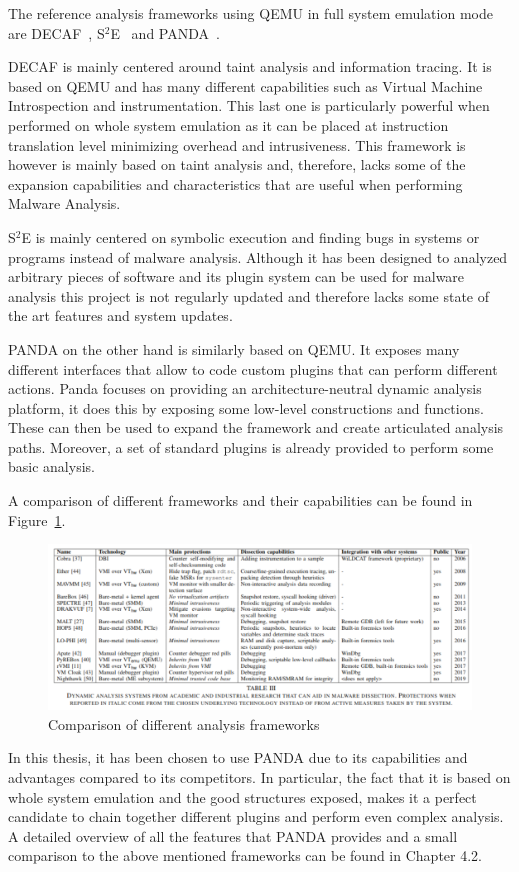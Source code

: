 The reference analysis frameworks using QEMU in full system emulation mode are DECAF~\cite{decaf}, S$^2$E~\cite{s2e} and PANDA~\cite{panda}. 

DECAF is mainly centered around taint analysis and information tracing. It is based on QEMU and has many different capabilities such as Virtual Machine Introspection and instrumentation. This last one is particularly powerful when performed on whole system emulation as it can be placed at instruction translation level minimizing overhead and intrusiveness. This framework is however is mainly based on taint analysis and, therefore, lacks some of the expansion capabilities and characteristics that are useful when performing Malware Analysis. 

S$^2$E is mainly centered on symbolic execution and finding bugs in systems or programs instead of malware analysis. Although it has been designed to analyzed arbitrary pieces of software and its plugin system can be used for malware analysis this project is not regularly updated and therefore lacks some state of the art features and system updates.  

PANDA on the other hand is similarly based on QEMU. It exposes many different interfaces that allow to code custom plugins that can perform different actions. Panda focuses on providing an architecture-neutral dynamic analysis platform, it does this by exposing some low-level constructions and functions. These can then be used to expand the framework and create articulated analysis paths. Moreover, a set of standard plugins is already provided to perform some basic analysis.

A comparison of different frameworks and their capabilities can be found in Figure~\ref{fig:frcmp}.

\begin{figure}[htp]
\centering
\includegraphics[width=\linewidth]{images/framcomp.png}
\caption{Comparison of different analysis frameworks~\cite{9018111}}
\label{fig:frcmp}
\end{figure}

In this thesis, it has been chosen to use PANDA due to its capabilities and advantages compared to its competitors. In particular, the fact that it is based on whole system emulation and the good structures exposed, makes it a perfect candidate to chain together different plugins and perform even complex analysis. A detailed overview of all the features that PANDA provides and a small comparison to the above mentioned frameworks can be found in Chapter 4.2.